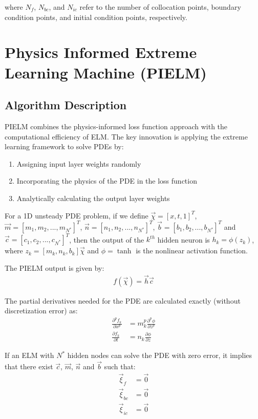 \documentclass[11pt]{article}
\begin{document}
where $N_f$, $N_{bc}$, and $N_{ic}$ refer to the number of collocation points, boundary condition points, and initial condition points, respectively.

\section{Physics Informed Extreme Learning Machine (PIELM)}

\subsection{Algorithm Description}

PIELM combines the physics-informed loss function approach with the computational efficiency of ELM. The key innovation is applying the extreme learning framework to solve PDEs by:

\begin{enumerate}
    \item Assigning input layer weights randomly
    \item Incorporating the physics of the PDE in the loss function
    \item Analytically calculating the output layer weights
\end{enumerate}

For a 1D unsteady PDE problem, if we define $\vec{\chi} = [x, t, 1]^T$, $\vec{m} = [m_1, m_2, ..., m_{N^*}]^T$, $\vec{n} = [n_1, n_2, ..., n_{N^*}]^T$, $\vec{b} = [b_1, b_2, ..., b_{N^*}]^T$ and $\vec{c} = [c_1, c_2, ..., c_{N^*}]^T$, then the output of the $k^{th}$ hidden neuron is $h_k = \phi(z_k)$, where $z_k = [m_k, n_k, b_k]\vec{\chi}$ and $\phi = \tanh$ is the nonlinear activation function.

The PIELM output is given by:
\begin{align}
f(\vec{\chi}) = \vec{h}\vec{c}
\end{align}

The partial derivatives needed for the PDE are calculated exactly (without discretization error) as:
\begin{align}
\frac{\partial^p f_k}{\partial x^p} &= m_k^p \frac{\partial^p \phi}{\partial z^p}\\
\frac{\partial f_k}{\partial t} &= n_k \frac{\partial \phi}{\partial z}
\end{align}

If an ELM with $N^*$ hidden nodes can solve the PDE with zero error, it implies that there exist $\vec{c}$, $\vec{m}$, $\vec{n}$ and $\vec{b}$ such that:
\begin{align}
\vec{\xi}_f &= \vec{0}\\
\vec{\xi}_{bc} &= \vec{0}\\
\vec{\xi}_{ic} &= \vec{0}
\end{align}
\end{document}

